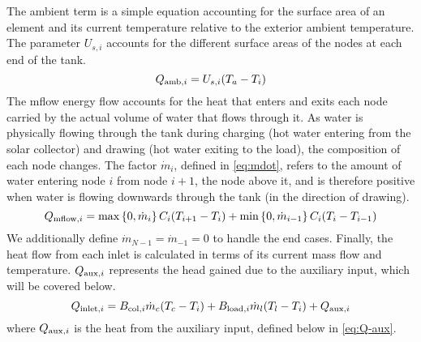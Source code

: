 The ambient term is a simple equation accounting for the surface area of an element and its current temperature relative to the exterior ambient temperature.
The parameter $U_{s, i}$ accounts for the different surface areas of the nodes at each end of the tank.
\begin{equation}
   Q_{\text{amb}, i} = U_{s, i} (T_a - T_i)
\end{equation}
The mflow energy flow accounts for the heat that enters and exits each node carried by the actual volume of water that flows through it.
As water is physically flowing through the tank during charging (hot water entering from the solar collector) and drawing (hot water exiting to the load), the composition of each node changes.
The factor $\dot{m}_i$, defined in \autoref{eq:mdot}, refers to the amount of water entering node $i$ from node $i+1$, the node above it, and is therefore positive when water is flowing downwards through the tank (in the direction of drawing).
\begin{equation}
   Q_{\text{mflow}, i} = \max \left\{ 0, \dot{m}_i \right\}     C_i (T_{i+1} - T_i)
             + \min \left\{ 0, \dot{m}_{i-1} \right\} C_i (T_i - T_{i-1})
\end{equation}
We additionally define $\dot{m}_{N-1} = \dot{m}_{-1} = 0$ to handle the end cases.
Finally, the heat flow from each inlet is calculated in terms of its current mass flow and temperature.
$Q_{\text{aux}, i}$ represents the head gained due to the auxiliary input, which will be covered below.
\begin{equation}
   \label{eq:Q-inlet}
   Q_{\text{inlet}, i} = B_{\text{col}, i} \dot{m}_c (T_c - T_i)
             + B_{\text{load}, i} \dot{m}_l (T_l - T_i)
             + Q_{\text{aux}, i}
\end{equation}
where $Q_{\text{aux}, i}$ is the heat from the auxiliary input, defined below in \autoref{eq:Q-aux}.

